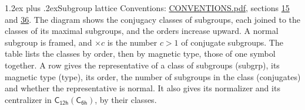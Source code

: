 \documentclass[10pt,a4paper]{article}
\makeatletter
\renewcommand\section{\@startsection{section}{1}{\z@}{-3ex plus -1ex minus -.2ex}%
  {1.2ex plus .2ex}{\normalfont\large\sffamily\bfseries\color{parttitle}}}
\numberwithin{equation}{section}
\newcommand{\grp}[1]{\mathsf{#1}}
\makeatother
\begin{document}
\section{Subgroup lattice}\label{s:subgroups}
Conventions: \href{../../CONVENTIONS.pdf}{CONVENTIONS.pdf}, sections \href{../../../rotation/CONVENTIONS.pdf\#conv.15}{15} and \href{../../CONVENTIONS.pdf\#conv.36}{36}.
The diagram shows the conjugacy classes of subgroups, each joined to the classes of its maximal subgroups, and the orders increase upward. \label{n:index.conjugates.c}A normal subgroup is framed, and ${\times}c$ is the number $c > 1$ of conjugate subgroups. The table lists the classes by order, then by magnetic type, those of one symbol together. \label{n:head.subgroup}\label{n:head.magnetic.type}\label{n:head.order}\label{n:head.conjugates}\label{n:head.normal}A row gives the representative of a class of subgroups (subgrp), its magnetic type (type), its order, the number of subgroups in the class (conjugates) and whether the representative is normal. \label{n:head.normalizer}\label{n:head.centralizer}It also gives its normalizer and its centralizer in $\grp{C_{12h}}(\grp{C_{6h}})$, by their classes. 
\end{document}
